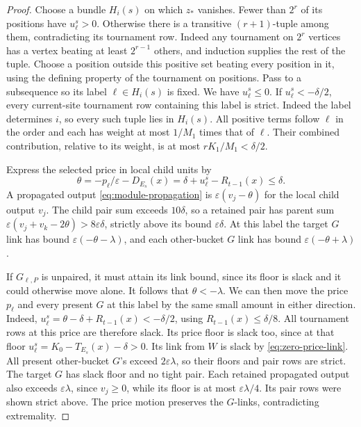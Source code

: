 \begin{proof}
Choose a bundle $H_i(s)$ on which $z_*$ vanishes. Fewer than $2^r$
of its positions have $u_\ell^s>0$. Otherwise there is a transitive
$(r+1)$-tuple among them, contradicting its tournament row. Indeed
any tournament on $2^r$ vertices has a vertex beating at least
$2^{r-1}$ others, and induction supplies the rest of the tuple. Choose
a position outside this positive set beating every position in it,
using the defining property of the tournament on positions. Pass to a
subsequence so its label $\ell\in H_i(s)$ is fixed. We have $u_\ell^s\le0$.
If $u_\ell^s<-\delta/2$, every current-site tournament row containing
this label is strict. Indeed the label determines $i$, so every
such tuple lies in $H_i(s)$. All positive terms follow
$\ell$ in the order and each has weight at most $1/M_1$ times that
of $\ell$. Their combined contribution, relative to its weight, is
at most $rK_1/M_1<\delta/2$.

Express the selected price in local child units by
\[
  \theta=-p_\ell/\varepsilon-D_{E_s}(x)
        =\delta+u_\ell^s-R_{t-1}(x)\le\delta .
\]
A propagated output \eqref{eq:module-propagation} is
$\varepsilon(v_j-\theta)$ for the local child output $v_j$.
The child pair sum exceeds $10\delta$, so a
retained pair has parent sum $\varepsilon(v_j+v_k-2\theta)>8\varepsilon\delta$,
strictly above its bound $\varepsilon\delta$.
At this label the target $G$ link has bound $\varepsilon(-\theta-\lambda)$,
and each other-bucket $G$ link has bound $\varepsilon(-\theta+\lambda)$.

If $G_{\ell,P}$ is unpaired, it must attain its link bound, since its floor is slack and it could otherwise move alone. It follows that
$\theta<-\lambda$. We can then move the price $p_\ell$ and every
present $G$ at this label by the same small amount in either
direction. Indeed,
$u_\ell^s=\theta-\delta+R_{t-1}(x)<-\delta/2$, using
$R_{t-1}(x)\le\delta/8$. All tournament rows at this price are
therefore slack. Its price floor is slack too, since at that floor
$u_\ell^s=K_0-T_{E_s}(x)-\delta>0$.
Its link from $W$ is slack by \eqref{eq:zero-price-link}.
All present other-bucket $G$'s exceed $2\varepsilon\lambda$, so their
floors and pair rows are strict. The target $G$ has slack floor and
no tight pair. Each retained propagated output also exceeds \(\varepsilon\lambda\),
since \(v_j\ge0\), while its floor is at most
\(\varepsilon\lambda/4\). Its pair rows were shown strict above.
The price motion preserves the \(G\)-links, contradicting extremality.


\end{proof}

